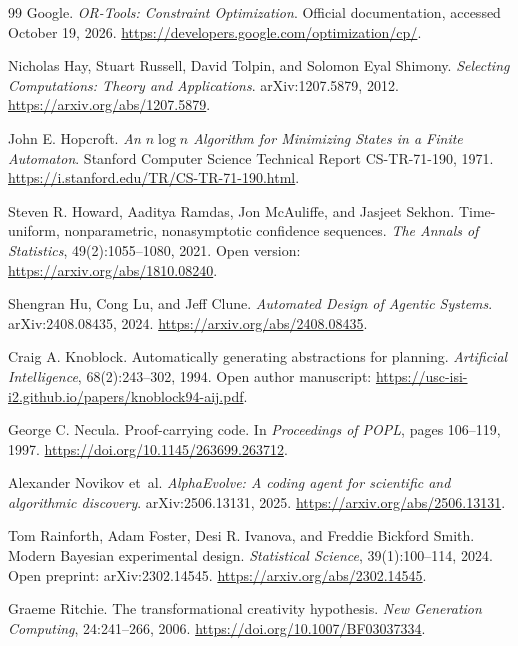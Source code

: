\documentclass[11pt,letterpaper]{article}
\theoremstyle{remark}\newtheorem{remark}{Remark}[section]
\begin{document}
\begin{thebibliography}{99}
Google. \emph{OR-Tools: Constraint Optimization}. Official documentation, accessed October 19, 2026. \url{https://developers.google.com/optimization/cp/}.

Nicholas Hay, Stuart Russell, David Tolpin, and Solomon Eyal Shimony. \emph{Selecting Computations: Theory and Applications}. arXiv:1207.5879, 2012. \url{https://arxiv.org/abs/1207.5879}.

John E. Hopcroft. \emph{An $n\log n$ Algorithm for Minimizing States in a Finite Automaton}. Stanford Computer Science Technical Report CS-TR-71-190, 1971. \url{https://i.stanford.edu/TR/CS-TR-71-190.html}.

Steven R. Howard, Aaditya Ramdas, Jon McAuliffe, and Jasjeet Sekhon. Time-uniform, nonparametric, nonasymptotic confidence sequences. \emph{The Annals of Statistics}, 49(2):1055--1080, 2021. Open version: \url{https://arxiv.org/abs/1810.08240}.

Shengran Hu, Cong Lu, and Jeff Clune. \emph{Automated Design of Agentic Systems}. arXiv:2408.08435, 2024. \url{https://arxiv.org/abs/2408.08435}.

Craig A. Knoblock. Automatically generating abstractions for planning. \emph{Artificial Intelligence}, 68(2):243--302, 1994. Open author manuscript: \url{https://usc-isi-i2.github.io/papers/knoblock94-aij.pdf}.

George C. Necula. Proof-carrying code. In \emph{Proceedings of POPL}, pages 106--119, 1997. \url{https://doi.org/10.1145/263699.263712}.

Alexander Novikov et~al. \emph{AlphaEvolve: A coding agent for scientific and algorithmic discovery}. arXiv:2506.13131, 2025. \url{https://arxiv.org/abs/2506.13131}.

Tom Rainforth, Adam Foster, Desi R. Ivanova, and Freddie Bickford Smith. Modern Bayesian experimental design. \emph{Statistical Science}, 39(1):100--114, 2024. Open preprint: arXiv:2302.14545. \url{https://arxiv.org/abs/2302.14545}.

Graeme Ritchie. The transformational creativity hypothesis. \emph{New Generation Computing}, 24:241--266, 2006. \url{https://doi.org/10.1007/BF03037334}.


\end{thebibliography}
\end{document}
